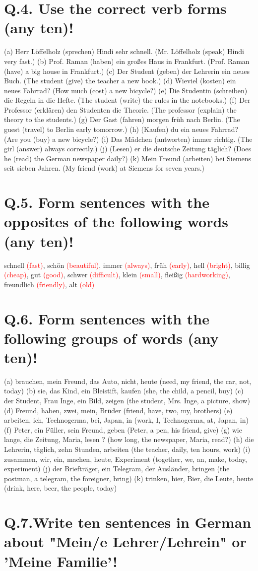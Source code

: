 \documentclass{article}
\begin{document}
\section*{Q.4. Use the correct verb forms (any ten)!}
(a) Herr Löffelholz (sprechen) Hindi sehr schnell. (Mr. Löffelholz (speak) Hindi very fast.)
(b) Prof. Raman (haben) ein großes Haus in Frankfurt. (Prof. Raman (have) a big house in Frankfurt.)
(c) Der Student (geben) der Lehrerin ein neues Buch. (The student (give) the teacher a new book.)
(d) Wieviel (kosten) ein neues Fahrrad? (How much (cost) a new bicycle?)
(e) Die Studentin (schreiben) die Regeln in die Hefte. (The student (write) the rules in the notebooks.)
(f) Der Professor (erklären) den Studenten die Theorie. (The professor (explain) the theory to the students.)
(g) Der Gast (fahren) morgen früh nach Berlin. (The guest (travel) to Berlin early tomorrow.)
(h) (Kaufen) du ein neues Fahrrad? (Are you (buy) a new bicycle?)
(i) Das Mädchen (antworten) immer richtig. (The girl (answer) always correctly.)
(j) (Lesen) er die deutsche Zeitung täglich? (Does he (read) the German newspaper daily?)
(k) Mein Freund (arbeiten) bei Siemens seit sieben Jahren. (My friend (work) at Siemens for seven years.)

\section*{Q.5. Form sentences with the opposites of the following words (any ten)!}
schnell \textcolor{red}{(fast)}, schön \textcolor{red}{(beautiful)}, immer \textcolor{red}{(always)}, früh \textcolor{red}{(early)}, hell \textcolor{red}{(bright)}, billig \textcolor{red}{(cheap)}, gut \textcolor{red}{(good)}, schwer \textcolor{red}{(difficult)}, klein \textcolor{red}{(small)}, fleißig \textcolor{red}{(hardworking)}, freundlich \textcolor{red}{(friendly)}, alt \textcolor{red}{(old)}

\section*{Q.6. Form sentences with the following groups of words (any ten)!}
(a) brauchen, mein Freund, das Auto, nicht, heute (need, my friend, the car, not, today)
(b) sie, das Kind, ein Bleistift, kaufen (she, the child, a pencil, buy)
(c) der Student, Frau Inge, ein Bild, zeigen (the student, Mrs. Inge, a picture, show)
(d) Freund, haben, zwei, mein, Brüder (friend, have, two, my, brothers)
(e) arbeiten, ich, Technogerma, bei, Japan, in (work, I, Technogerma, at, Japan, in)
(f) Peter, ein Füller, sein Freund, geben (Peter, a pen, his friend, give)
(g) wie lange, die Zeitung, Maria, lesen ? (how long, the newspaper, Maria, read?)
(h) die Lehrerin, täglich, zehn Stunden, arbeiten (the teacher, daily, ten hours, work)
(i) zusammen, wir, ein, machen, heute, Experiment (together, we, an, make, today, experiment)
(j) der Briefträger, ein Telegram, der Ausländer, bringen (the postman, a telegram, the foreigner, bring)
(k) trinken, hier, Bier, die Leute, heute (drink, here, beer, the people, today)

\section*{Q.7.Write ten sentences in German about "Mein/e Lehrer/Lehrein" or 'Meine Familie'! }
\end{document}
